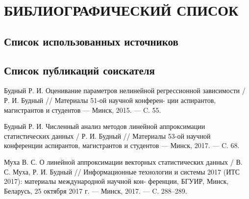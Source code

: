 \chapter*{БИБЛИОГРАФИЧЕСКИЙ СПИСОК}

\section*{Список использованных источников}

{
  \renewcommand{\chapter}[2]{}
  
}

\section*{Список публикаций соискателя}

\noindent [1"---A.] Будный Р. И.
Оценивание параметров нелинейной регрессионной
\hspace*{16.5mm} зависимости / Р. И. Будный // Материалы 51-ой научной конферен-
\hspace*{17mm} ции аспирантов, магистрантов и студентов --- Минск, 2015. --- C. 55.

\noindent [2"---A.] Будный Р. И.
Численный анализ методов линейной аппроксимации
\hspace*{15.5mm} статистических данных / Р. И. Будный // Материалы 53-ой научной
\hspace*{16mm} конференции аспирантов, магистрантов и студентов --- Минск, 2017.
\hspace*{16.5mm} --- C. 68.

\noindent [3"---A.] Муха В. С.
О линейной аппроксимации векторных статистических
\hspace*{15.5mm} данных / В. С. Муха, Р. И. Будный // Информационные технологии
\hspace*{16.5mm} и системы 2017 (ИТС 2017): материалы международной научной кон-
\hspace*{15.5mm} ференции, БГУИР, Минск, Беларусь, 25 октября 2017 г. --- Минск,
\hspace*{16.5mm} 2017. --- C. 288--289.
